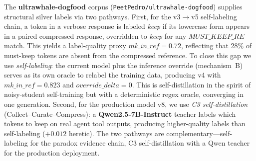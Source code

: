 The \textbf{ultrawhale-dogfood} corpus (\texttt{PeetPedro/ultrawhale-dogfood})
supplies structural silver labels via two pathways. First, for the v3$\to$v5
self-labeling chain, a token in a verbose response is labeled \emph{keep} if
its lowercase form appears in a paired compressed response, overridden to
\emph{keep} for any $\mathit{MUST\_KEEP\_RE}$ match. This yields a
label-quality proxy $\mathit{mk\_in\_ref}=0.72$, reflecting that 28\% of
must-keep tokens are absent from the compressed reference. To close this gap
we use \emph{self-labeling}: the current model plus the inference override
(mechanism~B) serves as its own oracle to relabel the training data,
producing v4 with $\mathit{mk\_in\_ref}=0.823$ and
$\mathit{override\_delta}{=}0$. This is self-distillation in the spirit of
noisy-student self-training \citep{xie2020noisy} but with a deterministic
regex oracle, converging in one generation. Second, for the production model
v8, we use \emph{C3 self-distillation} (Collect--Curate--Compress): a
\textbf{Qwen2.5-7B-Instruct} \citep{qwen2024qwen25} teacher labels which
tokens to keep on real agent tool outputs, producing higher-quality labels
than self-labeling ($+0.012$ heretic). The two pathways are
complementary---self-labeling for the paradox evidence chain, C3
self-distillation with a Qwen teacher for the production deployment.
